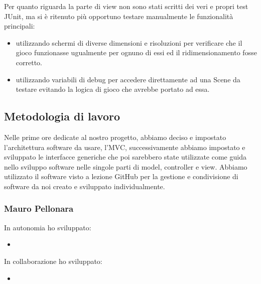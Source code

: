 Per quanto riguarda la parte di view non sono stati scritti dei veri e propri test JUnit, ma si è ritenuto più opportuno testare manualmente le funzionalità principali:
\begin{itemize}
    \item utilizzando schermi di diverse dimensioni e risoluzioni per verificare che il gioco funzionasse ugualmente per ognuno di essi ed il ridimensionamento fosse corretto.
    \item utilizzando variabili di debug per accedere direttamente ad una Scene da testare evitando la logica di gioco che avrebbe portato ad essa.
\end{itemize}

\subsection{Metodologia di lavoro}
Nelle prime ore dedicate al nostro progetto, abbiamo deciso e impostato l'architettura software da usare, l'MVC, successivamente abbiamo impostato e sviluppato le interfacce generiche che poi sarebbero state utilizzate come guida nello sviluppo software nelle singole parti di model, controller e view. Abbiamo utilizzato il software visto a lezione GitHub per la gestione e condivisione di software da noi creato e sviluppato individualmente.
\subsubsection*{Mauro Pellonara} 
In autonomia ho sviluppato:
\begin{itemize}
    \item 
\end{itemize}
In collaborazione ho sviluppato:
\begin{itemize}
    \item 
\end{itemize}

